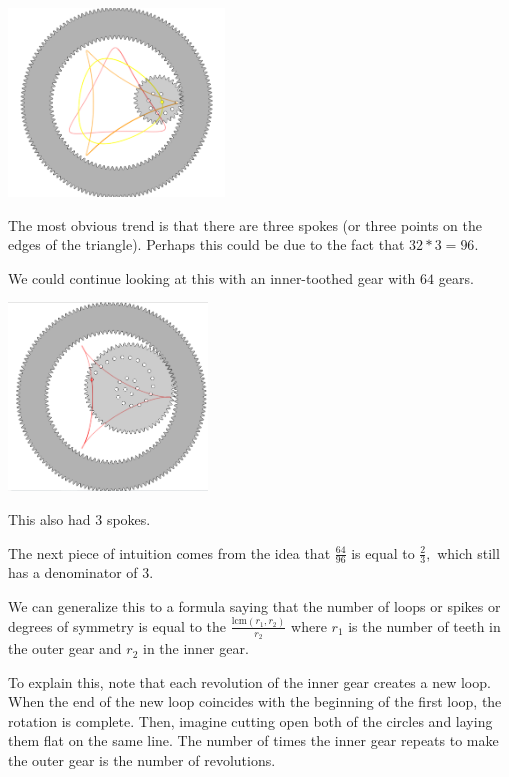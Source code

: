 \documentclass{article}
\theoremstyle{remark}
\theoremstyle{problem}
\numberwithin{problem}{subsection}
\numberwithin{Problem}{section}
\theoremstyle{definition}
\theoremstyle{definition}
\begin{document}
\begin{center}
\includegraphics[height=5cm]{images/Spokes.png}
\end{center}

The most obvious trend is that there are three spokes (or three points on the edges of the triangle). Perhaps this could be due to the fact that $32 * 3 = 96.$

We could continue looking at this with an inner-toothed gear with $64$ gears. 

\begin{center}
\includegraphics[height=5cm]{images/Gear72.png}
\end{center}

This also had $3$ spokes. 

The next piece of intuition comes from the idea that $\frac{64}{96}$ is equal to $\frac{2}{3},$ which still has a denominator of $3.$

We can generalize this to a formula saying that the number of loops or spikes or degrees of symmetry is equal to the $\frac{\text{lcm}(r_1, r_2)}{r_2}$ where $r_1$ is the number of teeth in the outer gear and $r_2$ in the inner gear.

To explain this, note that each revolution of the inner gear creates a new loop. When the end of the new loop coincides with the beginning of the first loop, the rotation is complete. Then, imagine cutting open both of the circles and laying them flat on the same line. The number of times the inner gear repeats to make the outer gear is the number of revolutions. 
\end{document}
